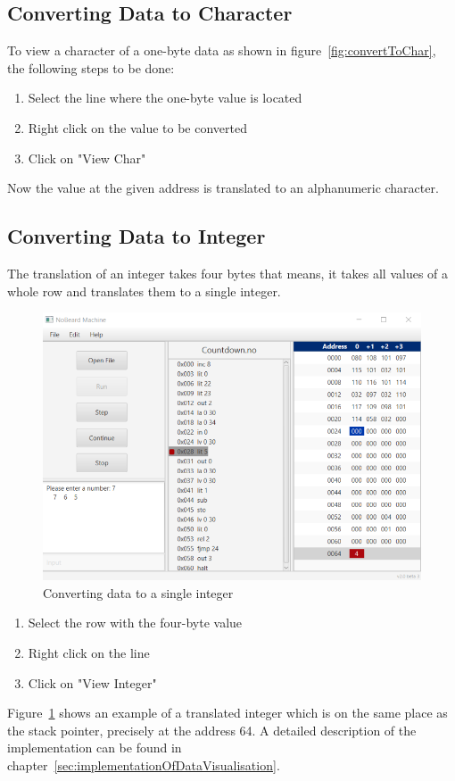 \subsection{Converting Data to Character}
To view a character of a one-byte data as shown in figure~\ref{fig:convertToChar}, the following steps  to be done:
\begin{enumerate}
\item Select the line where the one-byte value is located 
\item Right click on the value to be converted
\item Click on "View Char" 
\end{enumerate}
Now the value at the given address is translated to an alphanumeric character. 
\subsection{Converting Data to Integer}
The translation of an integer takes four bytes that means, it takes all values of a whole row and translates them to a single integer.  
\begin{figure}[h] 
	\centering
	\includegraphics[scale=.85]{images/screenshot-4.png}
	\caption{Converting data to a single integer}
	\label{fig:convertToInt}
\end{figure}
\begin{enumerate}
\item Select the row with the four-byte value 
\item Right click on the line
\item Click on "View Integer"
\end{enumerate}
Figure~\ref{fig:convertToInt} shows an example of a translated integer which is on the same place as the stack pointer, precisely at the address 64. A detailed description of the implementation can be found in chapter~\ref{sec:implementationOfDataVisualisation}. 

